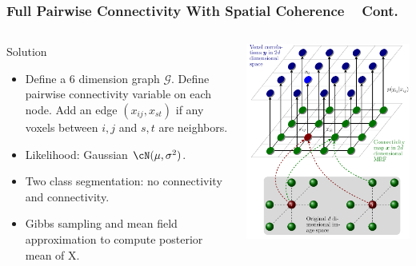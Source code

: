\documentclass[serif]{beamer}
\begin{document}
\begin{frame}
\frametitle{Full Pairwise Connectivity With Spatial Coherence ~\cite{liu2010spatialCopy} Cont.}
  \begin{columns}
    \begin{column}{7cm}
      \begin{block}{Solution}
        \begin{itemize}
        \item Define a 6 dimension graph $\mathcal{G}$. Define pairwise
          connectivity variable on each node.  Add an edge $(x_{ij}, x_{st})$ if
          any voxels between $i,j$ and $s,t$ are neighbors.
          \item Likelihood: Gaussian $\cN(\mu, \sigma^2)$.
        \item Two class segmentation: no connectivity and connectivity.
        \item Gibbs sampling and mean field approximation to compute posterior mean of X.
        \end{itemize}
      \end{block}
    \end{column}
    \begin{column}{5cm}
      \includegraphics[width=\textwidth]{sfig/6dmrf}
    \end{column}
    \end{columns}
\end{frame}
\end{document}
